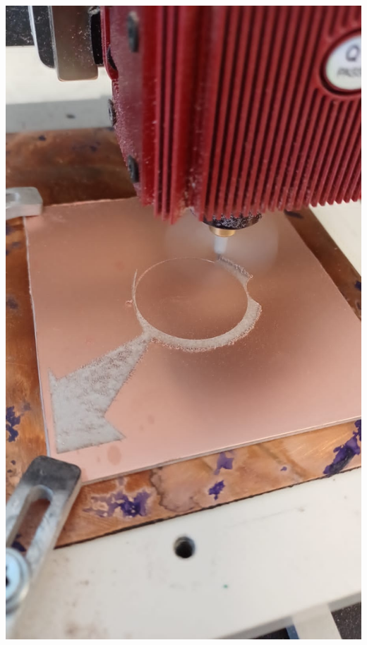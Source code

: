 \documentclass[a4paper, 12pt]{article}
\begin{document}
\begin{minipage}{0.33\linewidth}
\includegraphics[width=0.99\linewidth]{./img/construccion1.jpg}
\end{minipage}
\end{document}

